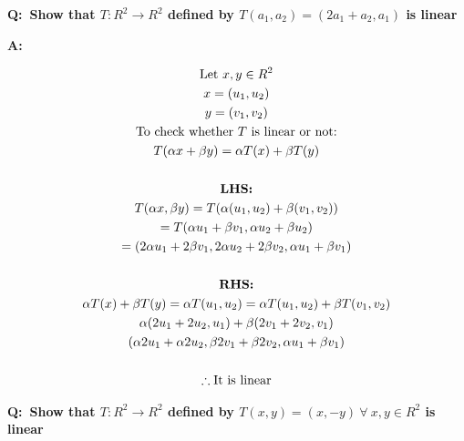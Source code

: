 \documentclass[english,course,fleqn]{lecture}
\newenvironment{qanda}{\setlength{\parindent}{0pt}}{\bigskip}
\newcommand{\Q}{\bigskip\bfseries Q:\ }
\newcommand{\A}{\par\textbf{A:} \normalfont}
\begin{document}
\begin{qanda}
	\Q Show that $T:R^{2} \rightarrow R^{2}$ defined by $T(a_{1}, a_{2}) = (2 a_{1} + a_{2}, a_{1})$ is linear

	\A

	\begin{gather*}
		\text{Let }x,y \in R^{2}\\
		x = (u_{1}, u_{2})\\
		y = (v_{1}, v_{2})
		\\
		\text{To check whether $T$ is linear or not:}\\
		T(\alpha x + \beta y) = \alpha T(x) + \beta T(y)\\
		\\
		\text{\textbf{LHS:}}\\
		T(\alpha x, \beta y ) = T(\alpha(u_{1}, u_{2}) + \beta (v_{1}, v_{2}))\\
		= T(\alpha u_{1} + \beta v_{1}, \alpha u_{2} + \beta u_{2})\\
		= (2 \alpha u_{1} + 2 \beta v_{1}, 2 \alpha u_{2} + 2 \beta v_{2}, \alpha u_{1} + \beta v_{1} )\\
		\\
		\text{\textbf{RHS:}}\\
		\alpha T(x) + \beta T (y) = \alpha T(u_{1}, u_{2}) = \alpha T(u_{1}, u_{2}) + \beta T(v_{1}, v_{2})\\
		\alpha (2u_{1} + 2u_{2}, u_{1}) + \beta (2v_{1} + 2v_{2}, v_{1})\\
		(\alpha 2 u_{1} + \alpha 2 u_{2}, \beta 2 v_{1} + \beta 2 v_{2}, \alpha u_{1} + \beta v_{1})\\
		\\
		\therefore \text{It is linear}
	\end{gather*}

	\Q Show that $T:R^{2} \rightarrow R^{2}$ defined by $T(x,y) = (x, -y) ~\forall~ x,y \in R^{2}$ is linear


\end{qanda}
\end{document}
